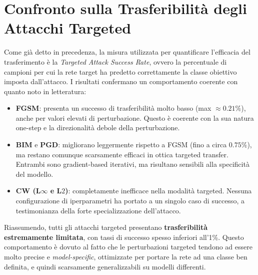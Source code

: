     \section{Confronto sulla Trasferibilità degli Attacchi Targeted}
        Come già detto in precedenza, la misura utilizzata per quantificare l'efficacia del trasferimento è la \textit{Targeted Attack Success Rate}, ovvero la percentuale di campioni per cui la rete target ha predetto correttamente la classe obiettivo imposta dall'attacco.
        I risultati confermano un comportamento coerente con quanto noto in letteratura:
            \begin{itemize}
                \item \textbf{FGSM}: presenta un successo di trasferibilità molto basso (max $\approx 0.21\%$), anche per valori elevati di perturbazione. Questo è coerente con la sua natura one-step e la direzionalità debole della perturbazione.
                
                \item \textbf{BIM} e \textbf{PGD}: migliorano leggermente rispetto a FGSM (fino a circa $0.75\%$), ma restano comunque scarsamente efficaci in ottica targeted transfer. Entrambi sono gradient-based iterativi, ma risultano sensibili alla specificità del modello.
                
                \item \textbf{CW (L$\infty$ e L$2$)}: completamente inefficace nella modalità targeted. Nessuna configurazione di iperparametri ha portato a un singolo caso di successo, a testimonianza della forte specializzazione dell'attacco.
            \end{itemize}

        \noindent Riassumendo, tutti gli attacchi targeted presentano \textbf{trasferibilità estremamente limitata}, con tassi di successo spesso inferiori all’1\%. Questo comportamento è dovuto al fatto che le perturbazioni targeted tendono ad essere molto precise e \textit{model-specific}, ottimizzate per portare la rete ad una classe ben definita, e quindi scarsamente generalizzabili su modelli differenti.